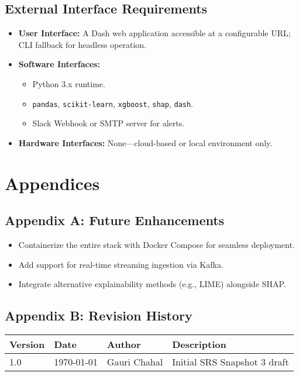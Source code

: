\documentclass[15pt]{article}
\begin{document}
\subsection{External Interface Requirements}

\begin{itemize}
  \item \textbf{User Interface:} A Dash web application accessible at a configurable URL; CLI fallback for headless operation.
  \item \textbf{Software Interfaces:} 
    \begin{itemize}
      \item Python 3.x runtime.
      \item \texttt{pandas}, \texttt{scikit-learn}, \texttt{xgboost}, \texttt{shap}, \texttt{dash}.
      \item Slack Webhook or SMTP server for alerts.
    \end{itemize}
  \item \textbf{Hardware Interfaces:} None—cloud-based or local environment only.
\end{itemize}

\section{Appendices}

\subsection{Appendix A: Future Enhancements}
\begin{itemize}
  \item Containerize the entire stack with Docker Compose for seamless deployment.
  \item Add support for real-time streaming ingestion via Kafka.
  \item Integrate alternative explainability methods (e.g., LIME) alongside SHAP.
\end{itemize}

\subsection{Appendix B: Revision History}
\begin{tabular}{|l|l|l|l|}
\hline
Version & Date   & Author       & Description                                        \\
\hline
1.0     & \today & Gauri Chahal & Initial SRS Snapshot 3 draft                        \\
\hline
\end{tabular}
\end{document}
